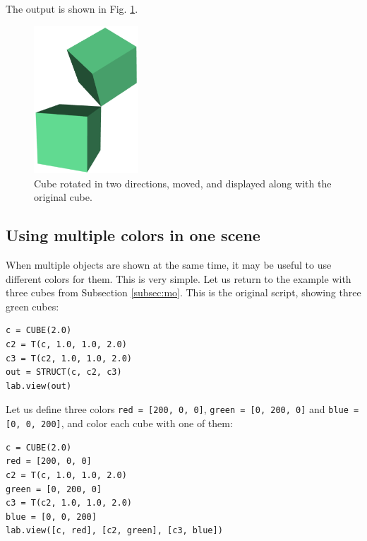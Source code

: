 \noindent
The output is shown in Fig. \ref{fig:rot-2}.
\newpage

\begin{figure}[!ht]
\begin{center}
\includegraphics[width=0.35\textwidth]{img/rot-2.png}
\end{center}
\vspace{-4mm}
\caption{Cube rotated in two directions, moved, and displayed along with the original cube.}
\label{fig:rot-2}
\end{figure}

\subsection{Using multiple colors in one scene} \label{subsec:multicolor}

When multiple objects are shown at the same time, it may be useful
to use different colors for them.
This is very simple. Let us return to the example with three cubes 
from Subsection \ref{subsec:mo}. This is the original script,
showing three green cubes:\\

\begin{bbox}
\begin{verbatim}
c = CUBE(2.0)
c2 = T(c, 1.0, 1.0, 2.0)
c3 = T(c2, 1.0, 1.0, 2.0)
out = STRUCT(c, c2, c3)
lab.view(out)
\end{verbatim}
\end{bbox}
\vspace{6mm}

\noindent
Let us define three colors {\tt red = [200, 0, 0]}, {\tt green = [0, 200, 0]}
and {\tt blue = [0, 0, 200]}, and color each cube with one of them:\\

\begin{bbox}
\begin{verbatim}
c = CUBE(2.0)
red = [200, 0, 0]
c2 = T(c, 1.0, 1.0, 2.0)
green = [0, 200, 0]
c3 = T(c2, 1.0, 1.0, 2.0)
blue = [0, 0, 200]
lab.view([c, red], [c2, green], [c3, blue])
\end{verbatim}
\end{bbox}
\noindent
\vspace{6mm}

